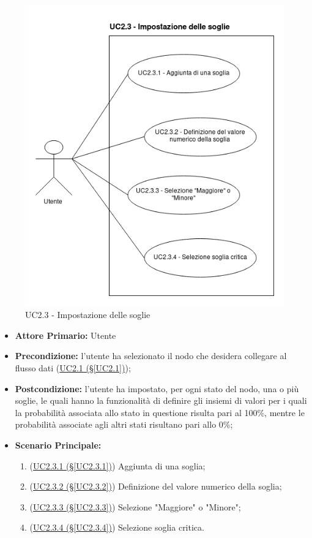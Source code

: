 \begin{figure}[H]
\centering
\includegraphics[scale=0.5]{./images/UC2-3.png}
\caption{UC2.3 - Impostazione delle soglie}
\end{figure}

\begin{itemize}
\item \textbf{Attore Primario:} Utente
\item \textbf{Precondizione:} l'utente ha selezionato il nodo che desidera collegare al flusso dati 					(\hyperref[UC2.1]{UC2.1 (§\ref*{UC2.1})});
\item \textbf{Postcondizione:} l'utente ha impostato, per ogni stato del nodo, una o più soglie, le quali hanno la funzionalità di definire gli insiemi di valori per i quali la probabilità associata allo stato in questione risulta pari al 100\%, mentre le probabilità associate agli altri stati risultano pari allo 0\%;
\item \textbf{Scenario Principale:}
	\begin{enumerate}
	\item (\hyperref[UC2.3.1]{UC2.3.1 (§\ref*{UC2.3.1})}) Aggiunta di una soglia;
	\item (\hyperref[UC2.3.2]{UC2.3.2 (§\ref*{UC2.3.2})}) Definizione del valore numerico della soglia;
	\item (\hyperref[UC2.3.3]{UC2.3.3 (§\ref*{UC2.3.3})}) Selezione "Maggiore" o "Minore";
	\item (\hyperref[UC2.3.4]{UC2.3.4 (§\ref*{UC2.3.4})}) Selezione soglia critica.
	\end{enumerate}
\end{itemize}

